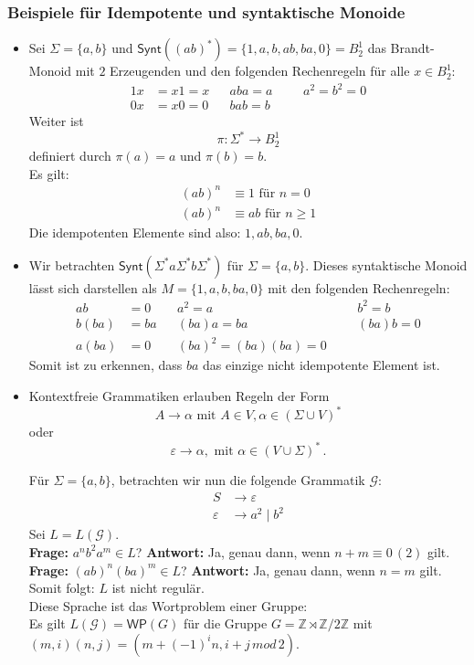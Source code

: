 \documentclass[12pt, german]{article}
\newcommand{\Z}{\mathbb{Z}}
\newcommand{\sigstern}{\Sigma^\ast}
\newcommand{\synt}{\mathsf{Synt}}
\begin{document}
	\subsubsection{Beispiele für Idempotente und syntaktische Monoide} 
	\begin{itemize}
		\item Sei $\Sigma = \{a, b\}$ und $\synt((ab)^\ast) = \{1, a ,b , ab, ba, 0\} = B^1_2$ das Brandt-Monoid mit $2$ Erzeugenden und den folgenden Rechenregeln für alle $x \in B^1_2$: 
		\begin{align*}
			1x &= x1 = x   &&aba = a  &&&a^2=b^2 = 0\\
			0x &= x0 = 0   &&bab = b 
		\end{align*}
		Weiter ist $$\pi: \sigstern \to B^1_2$$ definiert durch $\pi(a) = a$ und $\pi(b) = b$. \\
		Es gilt:
		\begin{align*}
			(ab)^n &\equiv 1 \text{ für } n = 0 \\
			(ab)^n &\equiv ab \text{ für } n \geq 1 
		\end{align*} Die idempotenten Elemente sind also: $1, ab ,ba, 0$.
		\item Wir betrachten $\mathsf{Synt}(\Sigma^*a\Sigma^*b\Sigma^*)$ für $\Sigma= \{a,b\}$. Dieses syntaktische Monoid lässt sich darstellen als $M = \{1, a, b, ba, 0\}$ mit den folgenden Rechenregeln: 
		\begin{align*}
			ab &= 0    && a^2 = a &&&b^2 = b \\
			b(ba) &= ba   &&(ba)a = ba &&& (ba)b = 0 \\
			a(ba) &= 0  &&(ba)^2 = (ba)(ba) = 0
		\end{align*}
		Somit ist zu erkennen, dass $ba$ das einzige nicht idempotente Element ist. 
		\item Kontextfreie Grammatiken erlauben Regeln der Form $$A \to \alpha \text{ mit } A \in V, \alpha \in (\Sigma \cup V)^\ast$$ oder $$\varepsilon \to \alpha, \text{ mit } \alpha \in (V \cup \Sigma)^\ast\, .$$ 
		
		Für $\Sigma = \{a, b\}$, betrachten wir nun die folgende Grammatik $\mathscr{G}$:
		\begin{align*}
			S &\to \varepsilon \\ 
			\varepsilon &\to a^2 \mid b^2 
		\end{align*} 
		Sei $L=L(\mathscr{G})$.\\
		\textbf{Frage:} $a^nb^2a^m \in L$? 
		\newline
		\textbf{Antwort:} Ja, genau dann, wenn $n+m \equiv 0\, (2)$ gilt.\\
		\newline
		\textbf{Frage:} $(ab)^n(ba)^m \in L$? 
		\newline
		\textbf{Antwort:} Ja, genau dann, wenn $n=m$ gilt.\\
		\newline
		Somit folgt: $L$ ist nicht regulär.\\
		Diese Sprache ist das Wortproblem einer Gruppe:\\
		Es gilt $L(\mathscr{G})=\mathsf{WP}(G)$ für die Gruppe $G=\Z \rtimes \Z/2\Z$ mit $(m,i)(n,j) = (m+(-1)^in, i+j\, mod\, 2) $.
	\end{itemize}
	
\end{document}
